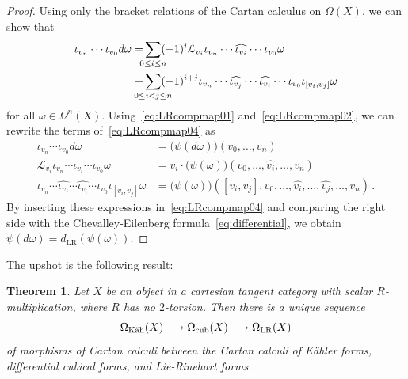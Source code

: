 \documentclass[12pt,reqno, a4paper]{amsart}
\numberwithin{equation}{section}
\theoremstyle{plain}
\newtheorem{Theorem}{Theorem}[section]
\theoremstyle{definition}
\theoremstyle{remark}
\newcommand{\Lie}{\mathcal{L}}
\begin{document}
\begin{proof}
Using only the bracket relations of the Cartan calculus on $\Omega(X)$, we can show that
\begin{equation}
\label{eq:LRcompmap04}
\begin{split}
  \iota_{v_n}\cdots \iota_{v_0} d\omega
  = &\sum_{\mathclap{0 \leq i \leq n}} (-1)^i \Lie_{v_i}
    \iota_{v_n} \cdots \widehat{\iota_{v_i}} \cdots \iota_{v_0} \omega
  \\
    + &\sum_{\mathclap{0 \leq i < j \leq n}} (-1)^{i+j}
    \iota_{v_n} \cdots \widehat{\iota_{v_j}} \cdots  \widehat{\iota_{v_i}}
    \cdots \iota_{v_0} \iota_{[v_i, v_j]} \omega
\end{split}
\end{equation}
for all $\omega \in \Omega^n(X)$. Using~\eqref{eq:LRcompmap01} and~\eqref{eq:LRcompmap02}, we can rewrite the terms of~\eqref{eq:LRcompmap04} as
\begin{align*}
  \iota_{v_n}\cdots \iota_{v_0} d\omega
  &= \bigl( \psi(d\omega) \bigr)(v_0, \ldots, v_n)
  \\
  \Lie_{v_i}
    \iota_{v_n} \cdots \widehat{\iota_{v_i}} \cdots \iota_{v_0} \omega
  &=
  v_i \cdot \bigl( \psi(\omega) \bigr)
  (v_0, \ldots, \widehat{v_i}, \ldots, v_n)
  \\
  \iota_{v_n} \cdots \widehat{\iota_{v_j}} \cdots  \widehat{\iota_{v_i}}
    \cdots \iota_{v_0} \iota_{[v_i, v_j]} \omega
  &=
  \bigl( \psi(\omega) \bigr)( [v_i, v_j], v_0, \ldots,
  \widehat{v_i}, \ldots, \widehat{v_j}, \ldots, v_n)
  \,.
\end{align*}
By inserting these expressions in~\eqref{eq:LRcompmap04} and comparing the right side with the Chevalley-Eilenberg formula~\eqref{eq:differential}, we obtain $\psi(d\omega) = d_\mathrm{LR}( \psi(\omega) )$.
\end{proof}

The upshot is the following result:

\begin{Theorem}
\label{thm:CompMaps}
Let $X$ be an object in a cartesian tangent category with scalar $R$-multiplication, where $R$ has no $2$-torsion. Then there is a unique sequence
\begin{equation}
\label{eq:CompMaps}
  \Omega_\text{\rm K\"ah}(X)
  \longrightarrow
  \Omega_\mathrm{cub}(X)
  \longrightarrow
  \Omega_\mathrm{LR}(X)
\end{equation}
of morphisms of Cartan calculi between the Cartan calculi of K\"ahler forms, differential cubical forms, and Lie-Rinehart forms.
\end{Theorem}
\end{document}
